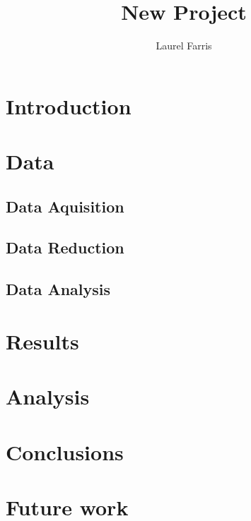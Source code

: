\documentclass[preprint]{aastex}
\begin{document}
\title{New Project}
\author{Laurel Farris}

\begin{abstract}
\end{abstract}

\section{Introduction}\label{intro}
\section{Data}
\subsection{Data Aquisition}
\subsection{Data Reduction}
\subsection{Data Analysis}
\section{Results}
\section{Analysis}
\section{Conclusions}
\section{Future work}


\end{document}

